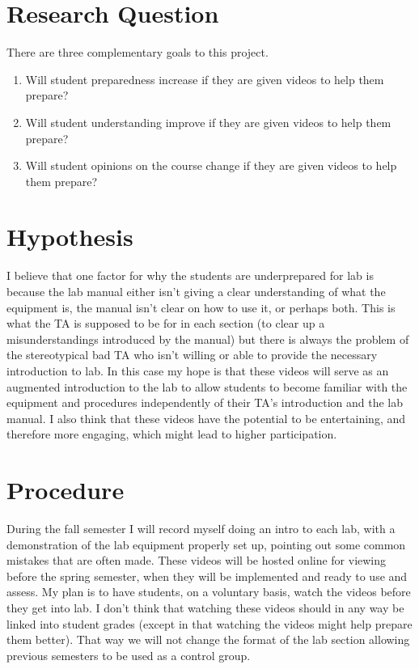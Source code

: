 \documentclass{article}
\begin{document}
\section{Research Question}

There are three complementary goals to this project. 

\begin{enumerate}
\item Will student preparedness increase if they are given videos to help them prepare? 
\item Will student understanding improve if they are given videos to help them prepare? 
\item Will student opinions on the course change if they are given videos to help them prepare? 
\end{enumerate}


\section{Hypothesis}

I believe that one factor for why the students are underprepared for lab is because the lab manual either isn't giving a clear understanding of what the equipment is, the manual isn't clear on how to use it, or perhaps both. This is what the TA is supposed to be for in each section (to clear up a misunderstandings introduced by the manual) but there is always the problem of the stereotypical bad TA who isn't willing or able to provide the necessary introduction to lab. In this case my hope is that these videos will serve as an augmented introduction to the lab to allow students to become familiar with the equipment and procedures independently of their TA's introduction and the lab manual. I also think that these videos have the potential to be entertaining, and therefore more engaging, which might lead to higher participation. 


\section{Procedure}

During the fall semester I will record myself doing an intro to each lab, with a demonstration of the lab equipment properly set up, pointing out some common mistakes that are often made. These videos will be hosted online for viewing before the spring semester, when they will be implemented and ready to use and assess. 
My plan is to have students, on a voluntary basis, watch the videos before they get into lab. I don't think that watching these videos should in any way be linked into student grades (except in that watching the videos might help prepare them better). That way we will not change the format of the lab section allowing previous semesters to be used as a control group. 
\end{document}

